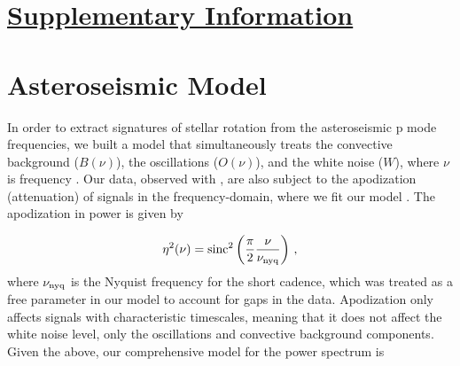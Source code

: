 %
%
%
%
%

\section*{\underline{Supplementary Information}}
\tableofcontents

\section{Asteroseismic Model}\label{s:seismo}
In order to extract signatures of stellar rotation from the asteroseismic p mode frequencies, we built a model that simultaneously treats the convective background ($B(\nu)$), the oscillations ($O(\nu)$), and the white noise ($W$), where $\nu$ is frequency \cite{davies+2015}. Our data, observed with \kepler, are also subject to the apodization (attenuation) of signals in the frequency-domain, where we fit our model \cite{chaplin+2011}. The apodization in power is given by

\begin{equation}\label{eq:apodization}
	\eta^2(\nu) = \rm{sinc}^2\left(\frac{\pi}{2}\frac{\nu}{\nu_{\rm nyq}}\right)\, ,
\end{equation}
where $\nu_{\rm nyq}$ is the Nyquist frequency for the \kepler short cadence, which was treated as a free parameter in our model to account for gaps in the data. Apodization only affects signals with characteristic timescales, meaning that it does not affect the white noise level, only the oscillations and convective background components. Given the above, our comprehensive model for the power spectrum is

